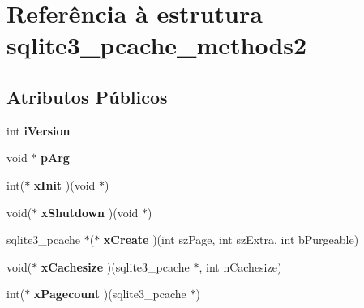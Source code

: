 \hypertarget{structsqlite3__pcache__methods2}{\section{Referência à estrutura sqlite3\-\_\-pcache\-\_\-methods2}
\label{structsqlite3__pcache__methods2}
}
\subsection*{Atributos Públicos}
\begin{DoxyCompactItemize}
\item 
\hypertarget{structsqlite3__pcache__methods2_a03b27be6c7cb8f1d2662c454cbe58483}{int {\bfseries i\-Version}}\label{structsqlite3__pcache__methods2_a03b27be6c7cb8f1d2662c454cbe58483}

\item 
\hypertarget{structsqlite3__pcache__methods2_a4bea91c33987eef02122bbf8a49745de}{void $\ast$ {\bfseries p\-Arg}}\label{structsqlite3__pcache__methods2_a4bea91c33987eef02122bbf8a49745de}

\item 
\hypertarget{structsqlite3__pcache__methods2_a8f77114458576c9d75cd53822fcd3462}{int($\ast$ {\bfseries x\-Init} )(void $\ast$)}\label{structsqlite3__pcache__methods2_a8f77114458576c9d75cd53822fcd3462}

\item 
\hypertarget{structsqlite3__pcache__methods2_a00a780e295b89976940cd3cba2cfeaee}{void($\ast$ {\bfseries x\-Shutdown} )(void $\ast$)}\label{structsqlite3__pcache__methods2_a00a780e295b89976940cd3cba2cfeaee}

\item 
\hypertarget{structsqlite3__pcache__methods2_a91e7752b826e19e7c51c1fa0ce530f0f}{sqlite3\-\_\-pcache $\ast$($\ast$ {\bfseries x\-Create} )(int sz\-Page, int sz\-Extra, int b\-Purgeable)}\label{structsqlite3__pcache__methods2_a91e7752b826e19e7c51c1fa0ce530f0f}

\item 
\hypertarget{structsqlite3__pcache__methods2_a4889ab0903938f485aa0fa4fc6925d26}{void($\ast$ {\bfseries x\-Cachesize} )(sqlite3\-\_\-pcache $\ast$, int n\-Cachesize)}\label{structsqlite3__pcache__methods2_a4889ab0903938f485aa0fa4fc6925d26}

\item 
\hypertarget{structsqlite3__pcache__methods2_a5d51aba3927db1da9acf31fbdf7d57b5}{int($\ast$ {\bfseries x\-Pagecount} )(sqlite3\-\_\-pcache $\ast$)}\label{structsqlite3__pcache__methods2_a5d51aba3927db1da9acf31fbdf7d57b5}


\end{DoxyCompactItemize}

